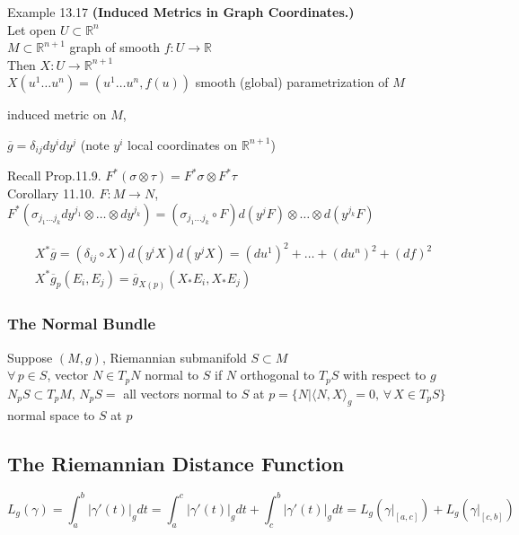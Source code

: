 Example 13.17 \textbf{(Induced Metrics in Graph Coordinates.)} \\
Let open $U \subset \mathbb{R}^n$ \\
\phantom{ Let open } $M \subset \mathbb{R}^{n+1}$ graph of smooth $f:U \to \mathbb{R}$ \\

Then $X:U\to \mathbb{R}^{n+1}$ \\
\phantom{ Then }$X(u^1 \dots u^n) = (u^1 \dots u^n, f(u))$ smooth (global) parametrization of $M$

induced metric on $M$,

$\overline{g} = \delta_{ij} dy^i dy^j$ (note $y^i$ local coordinates on $\mathbb{R}^{n+1}$)

Recall Prop.11.9. $F^*(\sigma \otimes \tau) = F^*\sigma \otimes F^*\tau$ \\
Corollary 11.10.  $F:M \to N$, \\
$F^*(\sigma_{j_1 \dots j_k} dy^{j_1} \otimes \dots \otimes dy^{j_k} ) = (\sigma_{j_1 \dots j_k} \circ F) d(y^j F) \otimes \dots \otimes d(y^{j_k}F)$ 

\[
\begin{gathered}
  X^* \overline{g} = (\delta_{ij} \circ X) d(y^i X) d(y^jX) = (du^1)^2 + \dots + (du^n)^2 + (df)^2 \\
  X^*\overline{g}_p(E_i , E_j) = \overline{g}_{X(p)}(X_* E_i, X_* E_j) 
\end{gathered}
\]


\subsubsection*{The Normal Bundle}

Suppose $(M,g)$, Riemannian submanifold $S\subset M$ \\
\quad $\forall \, p \in S$, vector $N \in T_pN$ normal to $S$ if $N$ orthogonal to $T_pS$ with respect to $g$ \\
\quad \quad $N_p S\subset T_pM$, $N_pS = $ all vectors normal to $S$ at $p = \lbrace N | \langle N, X \rangle_g = 0, \, \forall \, X \in T_pS \rbrace$ normal space to $S$ at $p$ \\



\subsection*{The Riemannian Distance Function}

\[
L_g(\gamma) = \int_a^b |\gamma'(t)|_g dt = \int_a^c |\gamma'(t)|_g dt  + \int_c^b |\gamma'(t) |_g dt = L_g(\left. \gamma \right|_{ [a,c] } ) + L_g( \left. \gamma \right|_{[c,b]} )
\]


